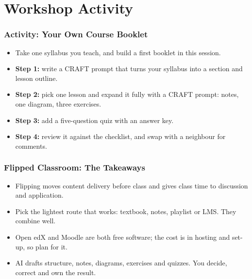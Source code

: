 \section[Activity]{Workshop Activity}

\begin{frame}[fragile]\frametitle{Activity: Your Own Course Booklet}
\begin{itemize}
\item Take one syllabus you teach, and build a first booklet in this session.
\item \textbf{Step 1:} write a CRAFT prompt that turns your syllabus into a section and lesson outline.
\item \textbf{Step 2:} pick one lesson and expand it fully with a CRAFT prompt: notes, one diagram, three exercises.
\item \textbf{Step 3:} add a five-question quiz with an answer key.
\item \textbf{Step 4:} review it against the checklist, and swap with a neighbour for comments.
\end{itemize}
\end{frame}

\begin{frame}[fragile]\frametitle{Flipped Classroom: The Takeaways}
\begin{itemize}
\item Flipping moves content delivery before class and gives class time to discussion and application.
\item Pick the lightest route that works: textbook, notes, playlist or LMS. They combine well.
\item Open edX and Moodle are both free software; the cost is in hosting and set-up, so plan for it.
\item AI drafts structure, notes, diagrams, exercises and quizzes. You decide, correct and own the result.
\end{itemize}
\end{frame}
